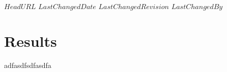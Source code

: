 \svnidlong
{$HeadURL$}
{$LastChangedDate$}
{$LastChangedRevision$}
{$LastChangedBy$}


\section{Results}

adfasdfsdfasdfa
